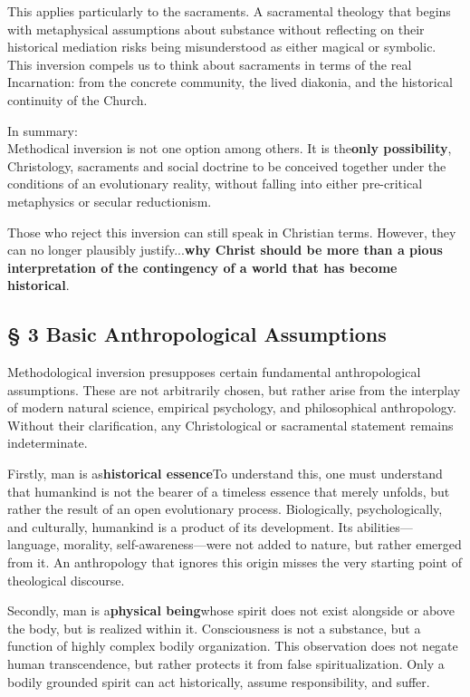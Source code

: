 \documentclass[
]{article}
\begin{document}
This applies particularly to the sacraments. A sacramental theology that begins with metaphysical assumptions about substance without reflecting on their historical mediation risks being misunderstood as either magical or symbolic. This inversion compels us to think about sacraments in terms of the real Incarnation: from the concrete community, the lived diakonia, and the historical continuity of the Church.

In summary:\\
Methodical inversion is not one option among others. It is the\textbf{only possibility}, Christology, sacraments and social doctrine to be conceived together under the conditions of an evolutionary reality, without falling into either pre-critical metaphysics or secular reductionism.

Those who reject this inversion can still speak in Christian terms. However, they can no longer plausibly justify...\textbf{why Christ should be more than a pious interpretation of the contingency of a world that has become historical}.

\subsection{\texorpdfstring{\textbf{§ 3 Basic Anthropological Assumptions}}{§ 3 Basic Anthropological Assumptions}}\label{basic-anthropological-assumptions}

Methodological inversion presupposes certain fundamental anthropological assumptions. These are not arbitrarily chosen, but rather arise from the interplay of modern natural science, empirical psychology, and philosophical anthropology. Without their clarification, any Christological or sacramental statement remains indeterminate.

Firstly, man is as\textbf{historical essence}To understand this, one must understand that humankind is not the bearer of a timeless essence that merely unfolds, but rather the result of an open evolutionary process. Biologically, psychologically, and culturally, humankind is a product of its development. Its abilities---language, morality, self-awareness---were not added to nature, but rather emerged from it. An anthropology that ignores this origin misses the very starting point of theological discourse.

Secondly, man is a\textbf{physical being}whose spirit does not exist alongside or above the body, but is realized within it. Consciousness is not a substance, but a function of highly complex bodily organization. This observation does not negate human transcendence, but rather protects it from false spiritualization. Only a bodily grounded spirit can act historically, assume responsibility, and suffer.
\end{document}
